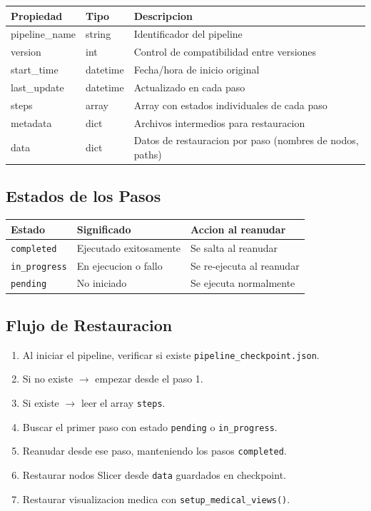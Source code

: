 \documentclass[12pt,a4paper]{article}
\begin{document}
\begin{table}[H]
\centering
\begin{tabular}{l l l}
\toprule
\textbf{Propiedad} & \textbf{Tipo} & \textbf{Descripcion} \\
\midrule
pipeline\_name & string & Identificador del pipeline \\
version & int & Control de compatibilidad entre versiones \\
start\_time & datetime & Fecha/hora de inicio original \\
last\_update & datetime & Actualizado en cada paso \\
steps & array & Array con estados individuales de cada paso \\
metadata & dict & Archivos intermedios para restauracion \\
data & dict & Datos de restauracion por paso (nombres de nodos, paths) \\
\bottomrule
\end{tabular}
\end{table}

\subsection{Estados de los Pasos}

\begin{table}[H]
\centering
\begin{tabular}{l l l}
\toprule
\textbf{Estado} & \textbf{Significado} & \textbf{Accion al reanudar} \\
\midrule
\texttt{completed} & Ejecutado exitosamente & Se salta al reanudar \\
\texttt{in\_progress} & En ejecucion o fallo & Se re-ejecuta al reanudar \\
\texttt{pending} & No iniciado & Se ejecuta normalmente \\
\bottomrule
\end{tabular}
\end{table}

\subsection{Flujo de Restauracion}

\begin{enumerate}
    \item Al iniciar el pipeline, verificar si existe \texttt{pipeline\_checkpoint.json}.
    \item Si no existe $\to$ empezar desde el paso 1.
    \item Si existe $\to$ leer el array \texttt{steps}.
    \item Buscar el primer paso con estado \texttt{pending} o \texttt{in\_progress}.
    \item Reanudar desde ese paso, manteniendo los pasos \texttt{completed}.
    \item Restaurar nodos Slicer desde \texttt{data} guardados en checkpoint.
    \item Restaurar visualizacion medica con \texttt{setup\_medical\_views()}.
\end{enumerate}
\end{document}
